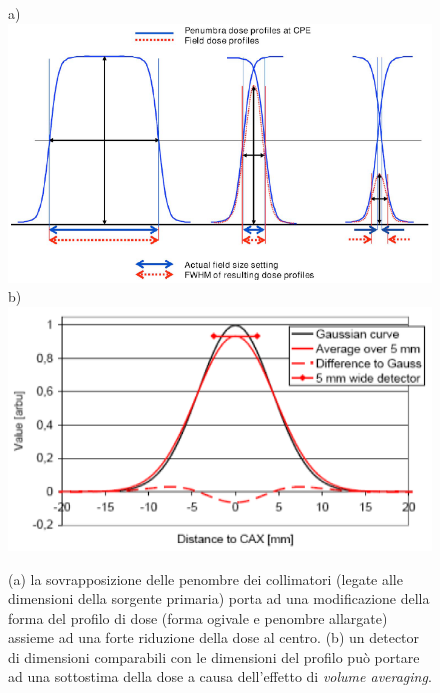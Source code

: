 \begin{figure}[!t]
\centering
a)\includegraphics[width=.7\textwidth]{./cap2/small_eff1.png}
b)\includegraphics[width=.7\textwidth]{./cap2/small_eff2.png}
\caption{(a) la sovrapposizione delle penombre dei collimatori (legate alle dimensioni della sorgente primaria) porta ad una modificazione della forma del profilo di dose (forma ogivale e penombre allargate) assieme ad una forte riduzione della dose al centro. (b) un detector di dimensioni comparabili con le dimensioni del profilo può portare ad una sottostima della dose a causa dell'effetto di \textit{volume averaging}.}
\label{fig:small_eff}
\end{figure}


